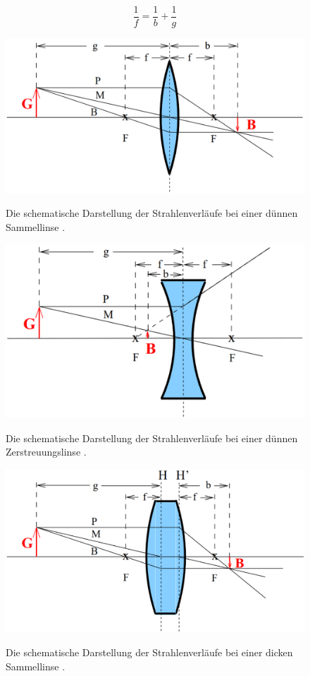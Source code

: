 \begin{equation}
	\frac{1}{f}=\frac{1}{b}+\frac{1}{g}\label{linsen}
\end{equation}
\begin{figure}
	\centering
	\caption{Die schematische Darstellung der Strahlenverläufe bei einer dünnen Sammellinse \cite{V408}.}
	\includegraphics[width=\linewidth-150pt,height=\textheight-150pt,keepaspectratio]{content/images/1.png}
	\label{1}
\end{figure}
\begin{figure}
	\centering
	\caption{Die schematische Darstellung der Strahlenverläufe bei einer dünnen Zerstreuungslinse \cite{V408}.}
	\includegraphics[width=\linewidth-150pt,height=\textheight-150pt,keepaspectratio]{content/images/2.png}
	\label{2}
\end{figure}
\begin{figure}
	\centering
	\caption{Die schematische Darstellung der Strahlenverläufe bei einer dicken Sammellinse \cite{V408}.}
	\includegraphics[width=\linewidth-150pt,height=\textheight-150pt,keepaspectratio]{content/images/3.png}
	\label{3}
\end{figure}
